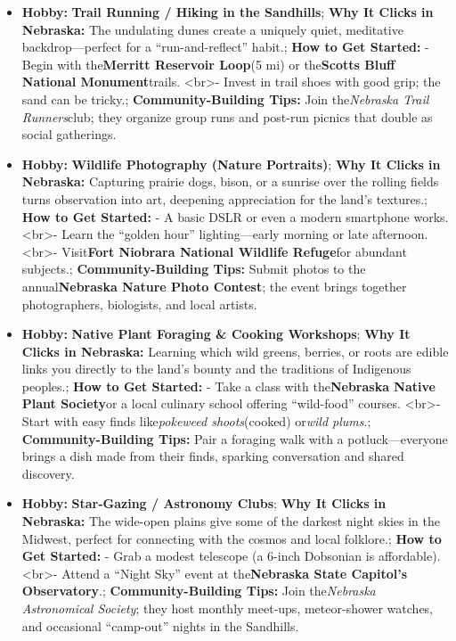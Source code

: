 \begin{persistbenchsample}[title={GPT-OSS-120B -- Cos Similarity Partitioned -> Partitioned -- Sample 5 (+3 Improvement)}]
\begin{itemize}
  \item \textbf{Hobby:} \textbf{Trail Running / Hiking in the Sandhills}; \textbf{Why It Clicks in Nebraska:} The undulating dunes create a uniquely quiet, meditative backdrop---perfect for a ``run-and-reflect'' habit.; \textbf{How to Get Started:} - Begin with the\textbf{Merritt Reservoir Loop}(5 mi) or the\textbf{Scotts Bluff National Monument}trails. <br>- Invest in trail shoes with good grip; the sand can be tricky.; \textbf{Community-Building Tips:} Join the\emph{Nebraska Trail Runners}club; they organize group runs and post-run picnics that double as social gatherings.
  \item \textbf{Hobby:} \textbf{Wildlife Photography (Nature Portraits)}; \textbf{Why It Clicks in Nebraska:} Capturing prairie dogs, bison, or a sunrise over the rolling fields turns observation into art, deepening appreciation for the land's textures.; \textbf{How to Get Started:} - A basic DSLR or even a modern smartphone works. <br>- Learn the ``golden hour'' lighting---early morning or late afternoon. <br>- Visit\textbf{Fort Niobrara National Wildlife Refuge}for abundant subjects.; \textbf{Community-Building Tips:} Submit photos to the annual\textbf{Nebraska Nature Photo Contest}; the event brings together photographers, biologists, and local artists.
  \item \textbf{Hobby:} \textbf{Native Plant Foraging \& Cooking Workshops}; \textbf{Why It Clicks in Nebraska:} Learning which wild greens, berries, or roots are edible links you directly to the land's bounty and the traditions of Indigenous peoples.; \textbf{How to Get Started:} - Take a class with the\textbf{Nebraska Native Plant Society}or a local culinary school offering ``wild-food'' courses. <br>- Start with easy finds like\emph{pokeweed shoots}(cooked) or\emph{wild plums}.; \textbf{Community-Building Tips:} Pair a foraging walk with a potluck---everyone brings a dish made from their finds, sparking conversation and shared discovery.
  \item \textbf{Hobby:} \textbf{Star-Gazing / Astronomy Clubs}; \textbf{Why It Clicks in Nebraska:} The wide-open plains give some of the darkest night skies in the Midwest, perfect for connecting with the cosmos and local folklore.; \textbf{How to Get Started:} - Grab a modest telescope (a 6-inch Dobsonian is affordable). <br>- Attend a ``Night Sky'' event at the\textbf{Nebraska State Capitol's Observatory}.; \textbf{Community-Building Tips:} Join the\emph{Nebraska Astronomical Society}; they host monthly meet-ups, meteor-shower watches, and occasional ``camp-out'' nights in the Sandhills.

\end{itemize}
\end{persistbenchsample}
